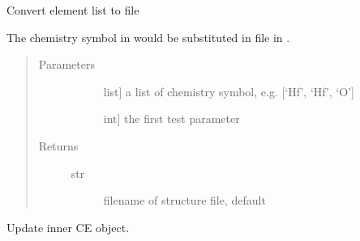 \documentclass[letterpaper,10pt,english]{sphinxmanual}
\begin{document}
\begin{fulllineitems}

\begin{fulllineitems}
\label{\detokenize{pygace:pygace.gace.AbstractApp.transver_to_struct}}
\sphinxAtStartPar
Convert element list to   file

\sphinxAtStartPar
The chemistry symbol in  would be substituted in
 file in .
\begin{quote}\begin{description}
\item[{Parameters}] \leavevmode\begin{description}
\item[{}] \leavevmode{[}list{]}
\sphinxAtStartPar
a list of chemistry symbol, e.g. {[}‘Hf’, ‘Hf’, ‘O’{]}

\item[{}] \leavevmode{[}int{]}
\sphinxAtStartPar
the first test parameter

\end{description}

\item[{Returns}] \leavevmode\begin{description}
\item[{str}] \leavevmode
\sphinxAtStartPar
filename of  structure file, default 

\end{description}

\end{description}\end{quote}

\end{fulllineitems}


\begin{fulllineitems}
\label{\detokenize{pygace:pygace.gace.AbstractApp.update_ce}}
\sphinxAtStartPar
Update inner CE object.


\end{fulllineitems}
\end{fulllineitems}
\end{document}
